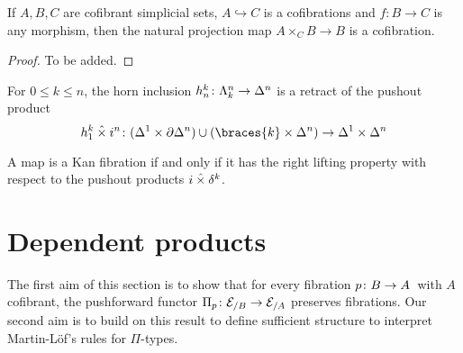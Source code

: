 \documentclass[reqno,10pt,a4paper,oneside,draft]{amsart}
\begin{document}
\begin{proposition} \label{thm:cof-pbk} If $A,B,C$ are cofibrant simplicial sets, $A \hookrightarrow C$ is a cofibrations and $f:B \rightarrow C$ is any morphism, then the natural projection map $A \times_C B \rightarrow B$ is a cofibration.
\end{proposition}

\begin{proof} To be added.
\end{proof} 



\begin{lemma} For $0 \leq k \leq n$, the horn inclusion $\horninc{k}{n} \co \Horn{k}{n} \to \Delt{n}$ is a retract of
the pushout product
\[
\horninc{k}{1} \hattimes i^n \co (\Delt{1} \times \Sphere{n} ) \cup (\braces{k} \times \Delt{n} ) \to \Delt{1} \times \Delt{n} 
\]
\end{lemma} 

\begin{proposition} A map is a Kan fibration if and only if it has the right lifting property with respect to the pushout products $i \hattimes \kcyl$.
\end{proposition} 


\newpage

\section{Dependent products}

The first aim of this section is to show that for every fibration $p \co B \to A$~with $A$ cofibrant, the pushforward functor $\Pi_p \co \catE_{/B} \to \calE_{/A}$ 
preserves fibrations. Our second aim is to build on this result to define sufficient structure to interpret Martin-L\"of's rules for $\Pi$-types. 

\medskip
\end{document}

